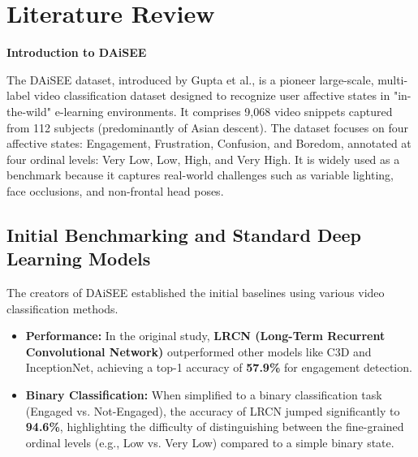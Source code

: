 
\chapter{Literature Review}
\label{ch:literature-review}

\textbf{\Large Introduction to DAiSEE}

The DAiSEE dataset, introduced by Gupta et al., is a pioneer large-scale, multi-label video classification dataset designed to recognize user affective states in "in-the-wild" e-learning environments\cite{Gupta2016DAiSEETU}. It comprises 9,068 video snippets captured from 112 subjects (predominantly of Asian descent)\cite{Gupta2016DAiSEETU}. The dataset focuses on four affective states: Engagement, Frustration, Confusion, and Boredom, annotated at four ordinal levels: Very Low, Low, High, and Very High\cite{Gupta2016DAiSEETU}. It is widely used as a benchmark because it captures real-world challenges such as variable lighting, face occlusions, and non-frontal head poses\cite{Gupta2016DAiSEETU}.

\section{Initial Benchmarking and Standard Deep Learning Models}
\label{sec:initial-benchmarking-and-standard-deep-learning-models}

The creators of DAiSEE established the initial baselines using various video classification methods.
\begin{itemize}
  \item{\textbf{Performance:} In the original study, \textbf{LRCN (Long-Term Recurrent Convolutional Network)} outperformed other models like C3D and InceptionNet, achieving a top-1 accuracy of \textbf{57.9\%} for engagement detection\cite{Gupta2016DAiSEETU}.}
  \item{\textbf{Binary Classification:} When simplified to a binary classification task (Engaged vs. Not-Engaged), the accuracy of LRCN jumped significantly to \textbf{94.6\%}, highlighting the difficulty of distinguishing between the fine-grained ordinal levels (e.g., Low vs. Very Low) compared to a simple binary state\cite{Gupta2016DAiSEETU}.}
\end{itemize}

